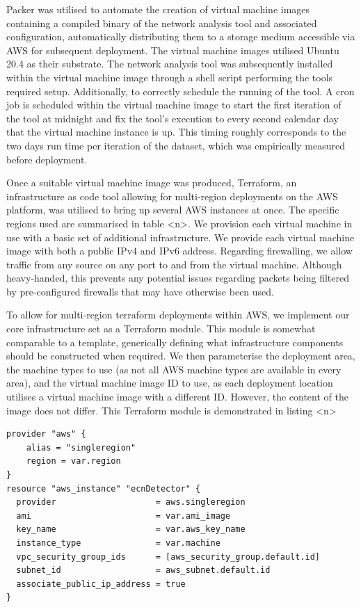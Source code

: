 \documentclass{l4proj}
\begin{document}
Packer was utilised to automate the creation of virtual machine images containing a compiled binary of the network analysis tool and associated configuration, automatically distributing them to a storage medium accessible via AWS for subsequent deployment. The virtual machine images utilised Ubuntu 20.4 as their substrate. The network analysis tool was subsequently installed within the virtual machine image through a shell script performing the tools required setup. Additionally, to correctly schedule the running of the tool. A cron job is scheduled within the virtual machine image to start the first iteration of the tool at midnight and fix the tool's execution to every second calendar day that the virtual machine instance is up. This timing roughly corresponds to the two days run time per iteration of the dataset, which was empirically measured before deployment.

Once a suitable virtual machine image was produced, Terraform, an infrastructure as code tool allowing for multi-region deployments on the AWS platform, was utilised to bring up several AWS instances at once. The specific regions used are summarised in table <n>. We provision each virtual machine in use with a basic set of additional infrastructure. We provide each virtual machine image with both a public IPv4 and IPv6 address. Regarding firewalling, we allow traffic from any source on any port to and from the virtual machine. Although heavy-handed, this prevents any potential issues regarding packets being filtered by pre-configured firewalls that may have otherwise been used.

To allow for multi-region terraform deployments within AWS, we implement our core infrastructure set as a Terraform module. This module is somewhat comparable to a template, generically defining what infrastructure components should be constructed when required. We then parameterise the deployment area, the machine types to use (as not all AWS machine types are available in every area), and the virtual machine image ID to use, as each deployment location utilises a virtual machine image with a different ID. However, the content of the image does not differ. This Terraform module is demonstrated in listing <n>

\begin{lstlisting}[caption={A demonstration of a parameterised Terraform module facilitating the multi-region deployment required to attain the goals of the research. details of IP address assignment and firewall rules have been omitted for the sake of brevity.}]
provider "aws" {
    alias = "singleregion"
    region = var.region
}
resource "aws_instance" "ecnDetector" {
  provider                    = aws.singleregion
  ami                         = var.ami_image
  key_name                    = var.aws_key_name
  instance_type               = var.machine
  vpc_security_group_ids      = [aws_security_group.default.id]
  subnet_id                   = aws_subnet.default.id
  associate_public_ip_address = true
}

\end{lstlisting}
\end{document}

